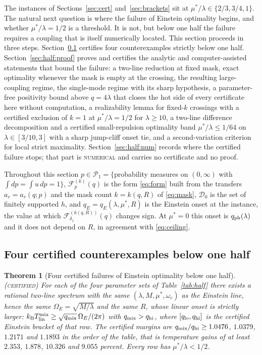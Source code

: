 \documentclass[11pt]{article}
\newcommand{\kb}{k_{\mathrm B}}
\newcommand{\Tlin}{T_{\mathrm{lin}}}
\newcommand{\OmE}{\Omega_E}
\newcommand{\Fcal}{\mathcal F}
\newcommand{\muS}{\mu^{*}}
\newtheorem{theorem}{Theorem}[section]
\theoremstyle{definition}
\theoremstyle{remark}
\newcommand{\certified}{\textnormal{\textsc{(certified)}}}
\begin{document}
The instances of Sections~\ref{sec:cert} and~\ref{sec:brackets} sit at
$\muS/\lambda\in\{2/3,3/4,1\}$. The natural next question is where the failure of Einstein
optimality begins, and whether $\muS/\lambda=1/2$ is a threshold. It is not, but below one
half the failure requires a coupling that is itself numerically located. This section
proceeds in three steps. Section~\ref{sec:half:cert} certifies four counterexamples
strictly below one half. Section~\ref{sec:half:proof} proves and certifies the analytic
and computer-assisted statements that bound the failure: a two-line reduction at fixed
mask, exact optimality whenever the mask is empty at the crossing, the resulting
large-coupling regime, the single-mode regime with its sharp hypothesis, a parameter-free
positivity bound above $q=4\lambda$ that closes the hot side of every certificate here
without computation, a realizability lemma for fixed-$k$ crossings with a certified exclusion
of $k=1$ at $\muS/\lambda=1/2$ for $\lambda\ge10$, a two-line difference decomposition and
a certified small-repulsion optimality band $\muS/\lambda\le1/64$ on $\lambda\in[3/10,3]$
with a sharp jump-cliff onset tie, and a second-variation criterion for local strict
maximality. Section~\ref{sec:half:num} records where the certified failure stops; that
part is \textsc{numerical} and carries no certificate and no proof.

Throughout this section $p\in\mathcal P_1=\{$probability measures on $(0,\infty)$ with
$\int dp=\int u\,dp=1\}$, $\Fcal_p^{(k)}(q)$ is the form \eqref{eq:form} built from the
transfers $a_r=a_r(q;p)$ and the mask count $k=k(q,R)$ of \eqref{eq:mask}, $\mathcal D_0$
is the set of finitely supported $h$, and $q_E=q_E(\lambda,\muS,R)$ is the Einstein onset
at the instance, the value at which $\Fcal_{\delta_1}^{(k(q,R))}(q)$ changes sign. At
$\muS=0$ this onset is $q_{\rm ph}(\lambda)$ and it does not depend on $R$, in agreement
with \eqref{eq:ceiling}.

\subsection{Four certified counterexamples below one half}\label{sec:half:cert}

\begin{theorem}[Four certified failures of Einstein optimality below one half]
\label{thm:half}\certified
For each of the four parameter sets of Table~\ref{tab:half} there exists a rational
two-line spectrum with the same $(\lambda,M,\muS,\omega_c)$ as the Einstein line, hence
the same $\OmE=\sqrt{M/\lambda}$ and the same $R$, whose linear onset is strictly larger:
$\kb\Tlin^{\rm mix}\ge\sqrt{q_{\rm mix}}\,\OmE/(2\pi)$ with $q_{\rm mix}>q_{\rm hi}$,
where $[q_{\rm lo},q_{\rm hi}]$ is the certified Einstein bracket of that row. The
certified margins are $q_{\rm mix}/q_{\rm hi}\ge1.0476$, $1.0379$, $1.2171$ and $1.1893$
in the order of the table, that is temperature gains of at least $2.353$, $1.878$,
$10.326$ and $9.055$ percent. Every row has $\muS/\lambda<1/2$.
\end{theorem}
\end{document}
